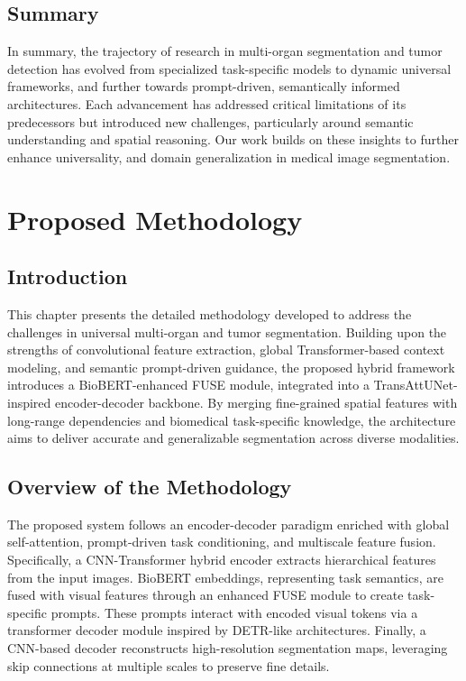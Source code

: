 \documentclass{cls/iutbscthesis}
\begin{document}
\section{Summary}
In summary, the trajectory of research in multi-organ segmentation and tumor detection has evolved from specialized task-specific models to dynamic universal frameworks, and further towards prompt-driven, semantically informed architectures. Each advancement has addressed critical limitations of its predecessors but introduced new challenges, particularly around semantic understanding and spatial reasoning. Our work builds on these insights to further enhance universality, and domain generalization in medical image segmentation.

\chapter{Proposed Methodology} \label{chapter:proposed}

\section{Introduction}

This chapter presents the detailed methodology developed to address the challenges in universal multi-organ and tumor segmentation. Building upon the strengths of convolutional feature extraction, global Transformer-based context modeling, and semantic prompt-driven guidance, the proposed hybrid framework introduces a BioBERT-enhanced FUSE module, integrated into a TransAttUNet-inspired encoder-decoder backbone. By merging fine-grained spatial features with long-range dependencies and biomedical task-specific knowledge, the architecture aims to deliver accurate and generalizable segmentation across diverse modalities.

\section{Overview of the Methodology}

The proposed system follows an encoder-decoder paradigm enriched with global self-attention, prompt-driven task conditioning, and multiscale feature fusion. Specifically, a CNN-Transformer hybrid encoder extracts hierarchical features from the input images. BioBERT embeddings, representing task semantics, are fused with visual features through an enhanced FUSE module to create task-specific prompts. These prompts interact with encoded visual tokens via a transformer decoder module inspired by DETR-like architectures. Finally, a CNN-based decoder reconstructs high-resolution segmentation maps, leveraging skip connections at multiple scales to preserve fine details.
\end{document}
